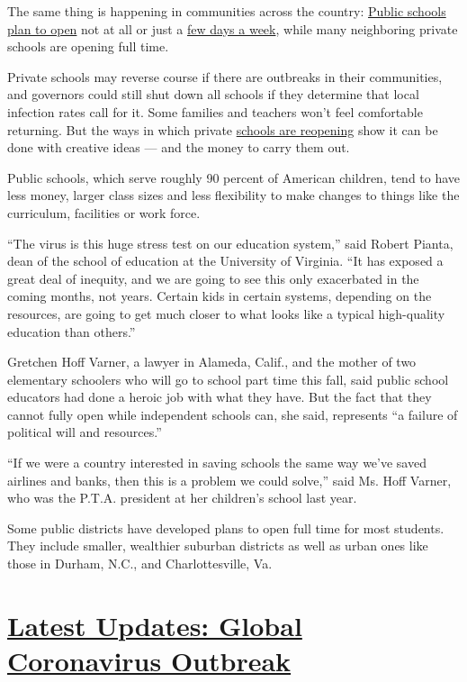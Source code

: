 The same thing is happening in communities across the country:
\href{https://www.nytimes.com/2020/08/03/us/school-closing-coronavirus.html}{Public
schools plan to open} not at all or just a
\href{https://www.nytimes.com/2020/07/08/nyregion/nyc-schools-reopening-plan.html}{few
days a week}, while many neighboring private schools are opening full
time.

Private schools may reverse course if there are outbreaks in their
communities, and governors could still shut down all schools if they
determine that local infection rates call for it. Some families and
teachers won't feel comfortable returning. But the ways in which private
\href{https://www.nytimes.com/interactive/2020/07/31/us/coronavirus-school-reopening-risk.html}{schools
are reopening} show it can be done with creative ideas --- and the money
to carry them out.

Public schools, which serve roughly 90 percent of American children,
tend to have less money, larger class sizes and less flexibility to make
changes to things like the curriculum, facilities or work force.

``The virus is this huge stress test on our education system,'' said
Robert Pianta, dean of the school of education at the University of
Virginia. ``It has exposed a great deal of inequity, and we are going to
see this only exacerbated in the coming months, not years. Certain kids
in certain systems, depending on the resources, are going to get much
closer to what looks like a typical high-quality education than
others.''

Gretchen Hoff Varner, a lawyer in Alameda, Calif., and the mother of two
elementary schoolers who will go to school part time this fall, said
public school educators had done a heroic job with what they have. But
the fact that they cannot fully open while independent schools can, she
said, represents ``a failure of political will and resources.''

``If we were a country interested in saving schools the same way we've
saved airlines and banks, then this is a problem we could solve,'' said
Ms. Hoff Varner, who was the P.T.A. president at her children's school
last year.

Some public districts have developed plans to open full time for most
students. They include smaller, wealthier suburban districts as well as
urban ones like those in Durham, N.C., and Charlottesville, Va.

\hypertarget{latest-updates-global-coronavirus-outbreak}{%
\section{\texorpdfstring{\href{https://www.nytimes.com/2020/08/04/world/coronavirus-cases.html?action=click\&pgtype=Article\&state=default\&region=MAIN_CONTENT_1\&context=storylines_live_updates}{Latest
Updates: Global Coronavirus
Outbreak}}{Latest Updates: Global Coronavirus Outbreak}}\label{latest-updates-global-coronavirus-outbreak}}

